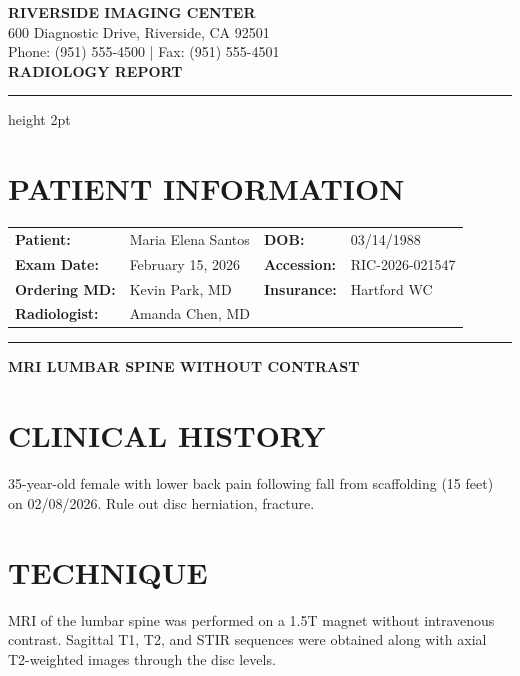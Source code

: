 \documentclass[11pt]{article}
\begin{document}
\begin{center}
{\Large\bfseries\color{imagingpurple} RIVERSIDE IMAGING CENTER}\\[0.3em]
{\small 600 Diagnostic Drive, Riverside, CA 92501}\\
{\small Phone: (951) 555-4500 | Fax: (951) 555-4501}\\[1em]
{\LARGE\bfseries RADIOLOGY REPORT}
\end{center}

\vspace{0.5em}
\hrule height 2pt
\vspace{1em}

\section*{PATIENT INFORMATION}

\begin{tabular}{@{}p{3.5cm}p{5cm}p{3cm}p{4cm}@{}}
\textbf{Patient:} & Maria Elena Santos & \textbf{DOB:} & 03/14/1988 \\
\textbf{Exam Date:} & February 15, 2026 & \textbf{Accession:} & RIC-2026-021547 \\
\textbf{Ordering MD:} & Kevin Park, MD & \textbf{Insurance:} & Hartford WC \\
\textbf{Radiologist:} & Amanda Chen, MD & & \\
\end{tabular}

\vspace{1em}
\hrule
\vspace{1em}

\begin{center}
{\Large\bfseries MRI LUMBAR SPINE WITHOUT CONTRAST}
\end{center}

\section*{CLINICAL HISTORY}

35-year-old female with lower back pain following fall from scaffolding (15 feet) on 02/08/2026. Rule out disc herniation, fracture.

\section*{TECHNIQUE}

MRI of the lumbar spine was performed on a 1.5T magnet without intravenous contrast. Sagittal T1, T2, and STIR sequences were obtained along with axial T2-weighted images through the disc levels.
\end{document}
